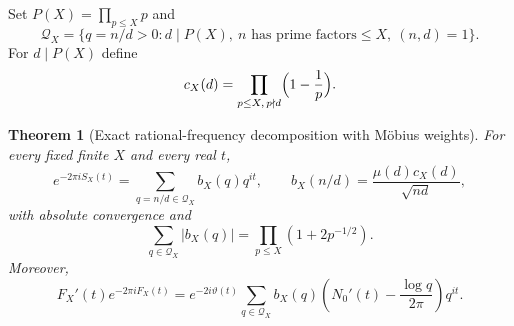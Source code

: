 \documentclass[11pt,reqno]{amsart}
\numberwithin{equation}{section}
\theoremstyle{plain}
\newtheorem{theorem}{Theorem}[section]
\theoremstyle{definition}
\theoremstyle{remark}
\begin{document}
Set $P(X)=\prod_{p\le X}p$ and
\begin{equation}\label{eq:coeffdef}
\mathscr Q_X=\{q=n/d>0: d\mid P(X),\ n\text{ has prime factors}\le X,\ (n,d)=1\}.
\end{equation}
For $d\mid P(X)$ define
\begin{equation}\label{eq:cX}
c_X(d)=\prod_{p\le X,\,p\nmid d}\Bigl(1-\frac1p\Bigr).
\end{equation}
\begin{theorem}[Exact rational-frequency decomposition with M\"obius weights]\label{thm:rational}
For every fixed finite $X$ and every real $t$,
\begin{equation}\label{eq:rational}
e^{-2\pi iS_X(t)}=\sum_{q=n/d\in\mathscr Q_X}
 b_X(q)q^{it},\qquad
b_X(n/d)=\frac{\mu(d)c_X(d)}{\sqrt{nd}},
\end{equation}
with absolute convergence and
\begin{equation}\label{eq:L1mass}
\sum_{q\in\mathscr Q_X}|b_X(q)|=\prod_{p\le X}(1+2p^{-1/2}).
\end{equation}
Moreover,
\begin{equation}\label{eq:rationalderiv}
F_X'(t)e^{-2\pi iF_X(t)}
=e^{-2i\vartheta(t)}\sum_{q\in\mathscr Q_X}
 b_X(q)\left(N_0'(t)-\frac{\log q}{2\pi}\right)q^{it}.
\end{equation}
\end{theorem}
\end{document}
